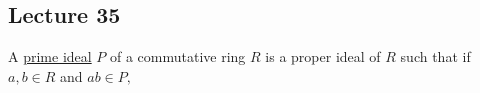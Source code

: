 \subsection*{Lecture 35} %

\begin{definition}
  A \ul{prime ideal} \( P \) of a commutative ring \( R \) is a proper ideal of \( R \) such that if \( a,b\in R \) and \( ab\in P, \)
\end{definition}